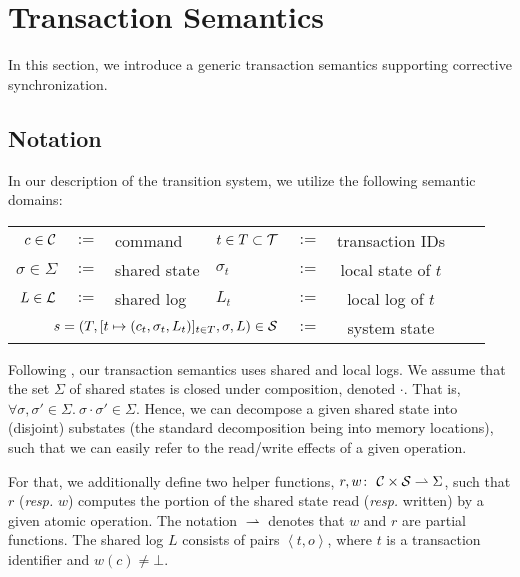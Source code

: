 \section{Transaction Semantics}
\label{sec:concretesemantics}

In this section, we introduce a generic transaction semantics supporting corrective synchronization.

\subsection{Notation}
\label{sec:concretedomain}

In our description of the transition system, we utilize the following semantic domains:
\vspace{-4pt}
\begin{center}
\footnotesize
\begin{tabular}{rcllrcll}
	$c \in {\cal C}$ & $:=$ & command & $t \in T \subset {\cal T}$ & $:=$ & transaction IDs \\
	$\sigma \in \Sigma$ & $:=$ & shared state & ${\sigma_t}$ & $:=$ & local state of $t$ \\
	$L \in {\cal L}$ & $:=$ & shared log &
	$L_t$ & $:=$ & local log of $t$ \\
	\multicolumn{4}{r}{
		$s = (T, [t \mapsto (c_t,\sigma_t,L_t)]_{t \in T}, \sigma, L) \in {\cal S}$} & $:=$ & system state \\
\end{tabular}
\end{center}
\vspace{-4pt}
\normalsize
Following \cite{KoskinenP15}, our transaction semantics uses shared and local logs.
We assume that the set $\Sigma$ of shared states is closed under composition, denoted $\cdot$. That is,
$\forall \sigma,\sigma' \in \Sigma.\ \sigma \cdot \sigma' \in \Sigma$. Hence, we can decompose a given shared state into (disjoint) substates (the standard decomposition being into memory locations), such that we can easily refer to the read/write effects of a given operation.

For that, we additionally define two helper functions,
$r,w \colon\ {\cal C} \times {\cal S} \rightharpoonup \Sigma$, such that $r$ (\textit{resp.} $w$) computes the portion of the shared state read (\textit{resp.} written) by a given atomic operation.
The notation $\rightharpoonup$ denotes that $w$ and $r$ are partial functions. The shared log $L$ consists of pairs $\left\langle t,o \right\rangle$, where $t$ is a transaction identifier and $w(c) \neq \bot$.

